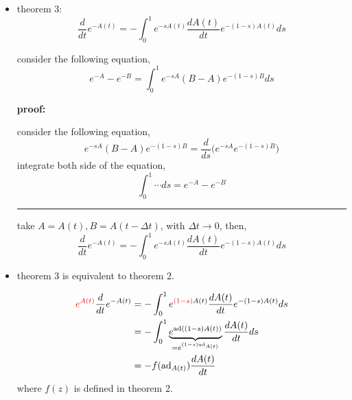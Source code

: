 \begin{itemize}
	\item theorem 3:
	\begin{equation}
		\frac{d}{dt} e^{- A(t)} = - \int_0^1 e^{- s A(t)} \frac{d A(t)}{dt} e^{- (1 - s) A(t)} ds
	\end{equation}
	
	\begin{tcolorbox}[title=proof:]
		consider the following equation,
		\begin{equation}
			e^{- A} - e^{- B} = \int_0^1 e^{- s A} (B - A) e^{- (1 - s) B} ds
		\end{equation}
		
		\noindent\hdashrule[0.5ex]{\linewidth}{0.5pt}{1mm} %
		
		\textbf{proof:}
		
		consider the following equation,
		\begin{equation}
			e^{- s A} (B - A) e^{- (1 - s) B} = \frac{d}{ds} \Big( e^{- s A} e^{- (1 - s) B} \Big)
		\end{equation}
		integrate both side of the equation,
		\begin{equation}
			\int_0^1 \cdots ds = e^{- A} - e^{- B}
		\end{equation}
		
		\noindent\rule[0.5ex]{\linewidth}{0.5pt} %
		
		take $A = A(t), B = A(t - \Delta t)$, with $\Delta t \rightarrow 0$, then,
		\begin{equation}
			\frac{d}{dt} e^{- A(t)} = - \int_0^1 e^{- s A(t)} \frac{d A(t)}{dt} e^{- (1 - s) A(t)} ds
		\end{equation}
	\end{tcolorbox}
	
	\item theorem 3 is equivalent to theorem 2.
	
	\begin{tcolorbox}[title=calculation:]
		\begin{align} 
			\mathcolor{red}{e^{A(t)}} \frac{d}{dt} e^{- A(t)} &= - \int_0^1 e^{\mathcolor{red}{(1 - s)} A(t)} \frac{d A(t)}{dt} e^{- (1 - s) A(t)} ds \notag \\
			&= - \int_0^1 \underbrace{e^{\mathrm{ad}((1 - s) A(t))}}_{= e^{(1 - s) \mathrm{ad}_{A(t)}}} \frac{d A(t)}{dt} ds \notag \\
			&= - f(\mathrm{ad}_{A(t)}) \frac{d A(t)}{dt}
		\end{align}
		where $f(z)$ is defined in theorem 2.
	\end{tcolorbox}
	

\end{itemize}
